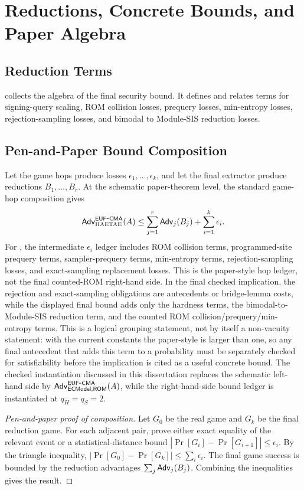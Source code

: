 \chapter{Reductions, Concrete Bounds, and Paper Algebra}
\label{ch:bounds}

\section{Reduction Terms}

 collects the algebra of the final security bound.
It defines and relates terms for signing-query scaling, ROM collision losses,
prequery losses, min-entropy losses, rejection-sampling losses, and bimodal to
Module-SIS reduction losses.

\section{Pen-and-Paper Bound Composition}

Let the game hops produce losses \(\epsilon_1,\ldots,\epsilon_k\), and let the
final extractor produce reductions \(B_1,\ldots,B_r\).  At the schematic
paper-theorem level, the standard game-hop composition gives
\[
\mathsf{Adv}^{\mathsf{EUF}\mbox{-}\mathsf{CMA}}_{\textsc{HAETAE}}(A)
\le
\sum_{j=1}^r \mathsf{Adv}_j(B_j) + \sum_{i=1}^k \epsilon_i.
\]
For \haetae{}, the intermediate \(\epsilon_i\) ledger includes ROM collision
terms, programmed-site prequery terms, sampler-prequery terms, min-entropy
terms, rejection-sampling losses, and exact-sampling replacement losses.  This
is the paper-style hop ledger, not the final counted-ROM right-hand side.  In
the final checked implication, the rejection and exact-sampling obligations are
antecedents or bridge-lemma costs, while the displayed final bound adds only the
hardness terms, the bimodal-to-Module-SIS reduction term, and the counted ROM
collision/prequery/min-entropy terms.  This is a logical grouping statement, not
by itself a non-vacuity statement: with the current constants the
paper-style  is larger than one, so any final
antecedent that adds this term to a probability must be separately checked for
satisfiability before the implication is cited as a useful concrete bound.
The checked instantiation discussed in this dissertation replaces the schematic
left-hand side by \(\mathsf{Adv}_{\mathsf{ECModel},\mathsf{ROM}}^{\mathsf{EUF}\mbox{-}\mathsf{CMA}}(A)\), while the
right-hand-side bound ledger is instantiated at \(q_H=q_S=2\).

\begin{proof}[Pen-and-paper proof of composition]
Let \(G_0\) be the real \eufcma{} game and \(G_k\) be the final reduction game.
For each adjacent pair, prove either exact equality of the relevant event or a
statistical-distance bound
\(|\Pr[G_i]-\Pr[G_{i+1}]|\le\epsilon_i\).  By the triangle inequality,
\(|\Pr[G_0]-\Pr[G_k]|\le\sum_i\epsilon_i\).  The final game success is bounded
by the reduction advantages \(\sum_j\mathsf{Adv}_j(B_j)\).  Combining the inequalities
gives the result.
\end{proof}

